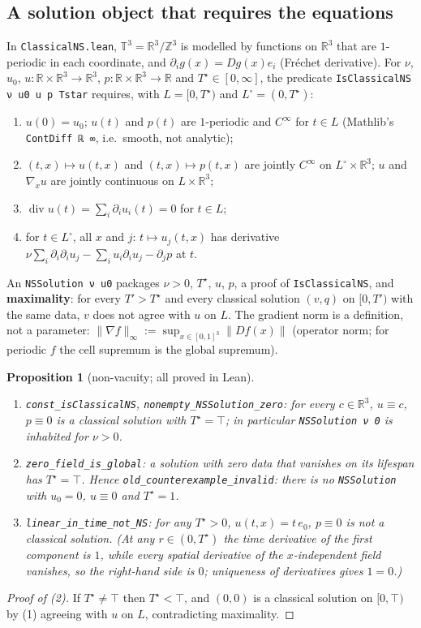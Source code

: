 \documentclass[11pt]{article}
\newtheorem{proposition}[theorem]{Proposition}
\theoremstyle{definition}
\newcommand{\T}{\mathbb{T}^3}
\newcommand{\R}{\mathbb{R}}
\newcommand{\Tstar}{T^\star}
\newcommand{\lean}[1]{\texttt{#1}}
\begin{document}
\subsection{A solution object that requires the equations}
In \lean{ClassicalNS.lean}, $\T=\R^3/\mathbb{Z}^3$ is modelled by functions on $\R^3$
that are $1$-periodic in each coordinate, and $\partial_i g(x) = Dg(x)e_i$ (Fréchet
derivative). For $\nu$, $u_0$, $u:\R\times\R^3\to\R^3$, $p:\R\times\R^3\to\R$ and
$\Tstar\in[0,\infty]$, the predicate \lean{IsClassicalNS ν u0 u p Tstar} requires, with
$L=[0,\Tstar)$ and $L^\circ=(0,\Tstar)$:
\begin{enumerate}
\item $u(0)=u_0$; $u(t)$ and $p(t)$ are $1$-periodic and $C^\infty$ for $t\in L$
(Mathlib's \lean{ContDiff ℝ ∞}, i.e.\ smooth, not analytic);
\item $(t,x)\mapsto u(t,x)$ and $(t,x)\mapsto p(t,x)$ are jointly $C^\infty$ on
$L^\circ\times\R^3$; $u$ and $\nabla_x u$ are jointly continuous on $L\times\R^3$;
\item $\operatorname{div} u(t) = \sum_i \partial_i u_i(t) = 0$ for $t\in L$;
\item for $t\in L^\circ$, all $x$ and $j$: $t\mapsto u_j(t,x)$ has derivative
$\nu\sum_i\partial_i\partial_i u_j - \sum_i u_i\partial_i u_j - \partial_j p$ at $t$.
\end{enumerate}
An \lean{NSSolution ν u0} packages $\nu>0$, $\Tstar$, $u$, $p$, a proof of
\lean{IsClassicalNS}, and \textbf{maximality}: for every $T'>\Tstar$ and every classical
solution $(v,q)$ on $[0,T')$ with the same data, $v$ does not agree with $u$ on $L$.
The gradient norm is a definition, not a parameter:
$\|\nabla f\|_\infty := \sup_{x\in[0,1]^3}\|Df(x)\|$ (operator norm; for periodic $f$ the
cell supremum is the global supremum).

\begin{proposition}[non-vacuity; all proved in Lean]\leavevmode
\begin{enumerate}
\item \lean{const\_isClassicalNS}, \lean{nonempty\_NSSolution\_zero}: for every
$c\in\R^3$, $u\equiv c$, $p\equiv 0$ is a classical solution with $\Tstar=\top$;
in particular \lean{NSSolution ν 0} is inhabited for $\nu>0$.
\item \lean{zero\_field\_is\_global}: a solution with zero data that vanishes on its
lifespan has $\Tstar=\top$. Hence \lean{old\_counterexample\_invalid}: there is no
\lean{NSSolution} with $u_0=0$, $u\equiv 0$ and $\Tstar=1$.
\item \lean{linear\_in\_time\_not\_NS}: for any $\Tstar>0$, $u(t,x)=t\,e_0$, $p\equiv 0$
is \emph{not} a classical solution. (At any $r\in(0,\Tstar)$ the time derivative of the
first component is $1$, while every spatial derivative of the $x$-independent field
vanishes, so the right-hand side is $0$; uniqueness of derivatives gives $1=0$.)
\end{enumerate}
\end{proposition}
\begin{proof}[Proof of (2)]
If $\Tstar\neq\top$ then $\Tstar<\top$, and $(0,0)$ is a classical solution on
$[0,\top)$ by (1) agreeing with $u$ on $L$, contradicting maximality.
\end{proof}
\end{document}
